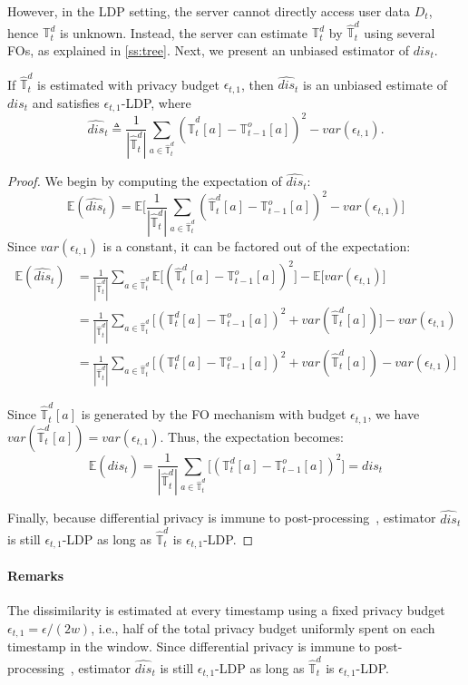 \documentclass[acmsmall]{acmart}
\newcommand{\E}{\mathbb{E}}
\newcommand{\Tree}{\mathbb{T}}
\newcommand{\DT}{\Tree^d}
\newcommand{\hDT}{\hat{\Tree}^d}
\newcommand{\OT}{\Tree^o}
\newcommand{\dis}{\mathit{dis}}
\newcommand{\hdis}{\hat{\mathit{dis}}}
\newcommand{\var}{\mathit{var}}
\begin{document}
However, in the LDP setting, the server cannot directly access user data $D_t$,
hence $\DT_t$ is unknown.
Instead, the server can estimate $\DT_t$ by $\hDT_t$ using several FOs, as
explained in \cref{ss:tree}.
Next, we present an unbiased estimator of $\dis_t$.

\begin{theorem}\label{thm:dis}
  If $\hDT_t$ is estimated with privacy budget $\epsilon_{t,1}$, then $\hdis_t$
  is an unbiased estimate of $\dis_t$ and satisfies $\epsilon_{t,1}$-LDP, where
  \[
    \hdis_t\triangleq\frac{1}{|\hDT_t|}
    \sum_{a\in\hDT_t} (\hDT_t[a] - \OT_{t-1}[a])^2 - \var(\epsilon_{t,1}).
  \]
\end{theorem}


\begin{proof}
We begin by computing the expectation of $\hdis_t$:
\[
\E(\hdis_t)
  = \E\big[ \frac{1}{|\hDT_t|}
    \sum_{a\in\hDT_t}(\hDT_t[a]-\OT_{t-1}[a])^2 - \var(\epsilon_{t,1}) \big]
\]
Since $\var(\epsilon_{t,1})$ is a constant, it can be factored out of the expectation:
\begin{align*}
  \E(\hdis_t)
  &= \frac{1}{|\hDT_t|}\sum_{a\in \hDT_t} \E\big[
    (\hDT_t[a] - \OT_{t-1}[a])^2\big]  - \E\big[ \var(\epsilon_{t,1}) \big] \\
  &= \frac{1}{|\hDT_t|}\sum_{a\in \hDT_t} \big[
    (\DT_t[a] - \OT_{t-1}[a])^2 + \var(\hDT_t[a])\big] - \var(\epsilon_{t,1}) \\
  &= \frac{1}{|\hDT_t|}\sum_{a\in \hDT_t} \big[
    (\DT_t[a] - \OT_{t-1}[a])^2 + \var(\hDT_t[a]) - \var(\epsilon_{t,1}) \big]
\end{align*}

Since $\hDT_t[a]$ is generated by the FO mechanism with
budget $\epsilon_{t,1}$, we have $\var(\hDT_t[a])=\var(\epsilon_{t,1})$. Thus, the expectation becomes:
\[
  \E(\hdis_t)
  = \frac{1}{|\hDT_t|}\sum_{a\in \hDT_t} \big[
  (\DT_t[a] - \OT_{t-1}[a])^2 \big]
  = dis_t
\]

Finally, because differential privacy is immune to post-processing~\cite{Dwork2013},
estimator $\hdis_t$ is still $\epsilon_{t,1}$-LDP as long as $\hDT_t$ is
$\epsilon_{t,1}$-LDP.
\end{proof}

\paragraph{Remarks}
The dissimilarity is estimated at every timestamp using a fixed privacy budget
$\epsilon_{t,1}=\epsilon/(2w)$, i.e., half of the total privacy budget
uniformly spent on each timestamp in the window.
Since differential privacy is immune to post-processing~\cite{Dwork2013},
estimator $\hdis_t$ is still $\epsilon_{t,1}$-LDP as long as $\hDT_t$ is
$\epsilon_{t,1}$-LDP.
\end{document}
